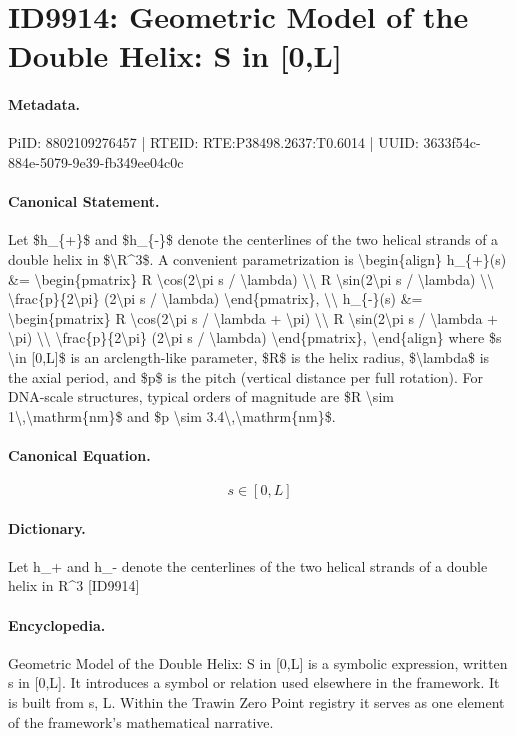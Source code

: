 \section*{ID9914: Geometric Model of the Double Helix: S in [0,L]}
\paragraph{Metadata.}
PiID: 8802109276457 | RTEID: RTE:P38498.2637:T0.6014 | UUID: 3633f54c-884e-5079-9e39-fb349ee04c0c

\paragraph{Canonical Statement.}
Let \$h\_\{+\}\$ and \$h\_\{-\}\$ denote the centerlines of the two helical strands of a double helix in \$\textbackslash{}R\textasciicircum{}3\$. A convenient parametrization is \textbackslash{}begin\{align\} h\_\{+\}(s) \&= \textbackslash{}begin\{pmatrix\} R \textbackslash{}cos(2\textbackslash{}pi s / \textbackslash{}lambda) \textbackslash{}\textbackslash{} R \textbackslash{}sin(2\textbackslash{}pi s / \textbackslash{}lambda) \textbackslash{}\textbackslash{} \textbackslash{}frac\{p\}\{2\textbackslash{}pi\} (2\textbackslash{}pi s / \textbackslash{}lambda) \textbackslash{}end\{pmatrix\}, \textbackslash{}\textbackslash{} h\_\{-\}(s) \&= \textbackslash{}begin\{pmatrix\} R \textbackslash{}cos(2\textbackslash{}pi s / \textbackslash{}lambda + \textbackslash{}pi) \textbackslash{}\textbackslash{} R \textbackslash{}sin(2\textbackslash{}pi s / \textbackslash{}lambda + \textbackslash{}pi) \textbackslash{}\textbackslash{} \textbackslash{}frac\{p\}\{2\textbackslash{}pi\} (2\textbackslash{}pi s / \textbackslash{}lambda) \textbackslash{}end\{pmatrix\}, \textbackslash{}end\{align\} where \$s \textbackslash{}in [0,L]\$ is an arclength-like parameter, \$R\$ is the helix radius, \$\textbackslash{}lambda\$ is the axial period, and \$p\$ is the pitch (vertical distance per full rotation). For DNA-scale structures, typical orders of magnitude are \$R \textbackslash{}sim 1\textbackslash{},\textbackslash{}mathrm\{nm\}\$ and \$p \textbackslash{}sim 3.4\textbackslash{},\textbackslash{}mathrm\{nm\}\$.

\paragraph{Canonical Equation.}
\[
s \in [0,L]
\]

\paragraph{Dictionary.}
Let h\_+ and h\_- denote the centerlines of the two helical strands of a double helix in R\textasciicircum{}3 [ID9914]

\paragraph{Encyclopedia.}
Geometric Model of the Double Helix: S in [0,L] is a symbolic expression, written s in [0,L]. It introduces a symbol or relation used elsewhere in the framework. It is built from s, L. Within the Trawin Zero Point registry it serves as one element of the framework's mathematical narrative.

